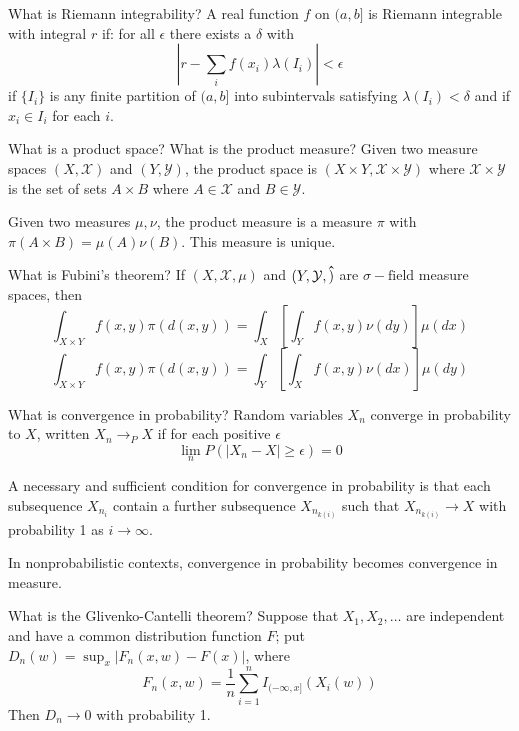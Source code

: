 \documentclass[avery5388,grid,frame]{flashcards}
\newcommand{\sigf}{\sigma-\text{field}}
\begin{document}
\begin{flashcard}
    {What is Riemann integrability?}
    A real function $f$ on $(a,b]$ is Riemann integrable with integral $r$ if: for all $\epsilon$ there exists a $\delta$ with
    $$| r - \sum_i f(x_i) \lambda(I_i) | < \epsilon$$
    if $\{ I_i \}$ is any finite partition of $(a,b]$ into subintervals satisfying $\lambda(I_i) < \delta$ and if $x_i \in I_i$ for each $i$.
\end{flashcard}


\begin{flashcard}
    {What is a product space? What is the product measure?}
    Given two measure spaces $(X,\mathcal X)$ and $(Y,\mathcal Y)$, the product space is $(X \times Y, \mathcal X \times \mathcal Y)$ where $\mathcal X \times \mathcal Y$ is the set of sets $A \times B$ where $A \in \mathcal X$ and $B \in \mathcal Y$.

    Given two measures $\mu, \nu$, the product measure is a measure $\pi$ with $\pi(A \times B) = \mu(A) \nu(B)$. This measure is unique.
\end{flashcard}


\begin{flashcard}
    {What is Fubini's theorem?}
    If $(X, \mathcal X, \mu)$ and $(Y, \mathcal Y, \vu)$ are $\sigf$ measure spaces, then
    $$\int_{X \times Y} f(x,y) \pi(d(x,y)) = \int_X \left [ \int_Y f(x,y) \nu(dy) \right ] \mu(dx)$$
    $$\int_{X \times Y} f(x,y) \pi(d(x,y)) = \int_Y \left [ \int_X f(x,y) \nu(dx) \right ] \mu(dy)$$
\end{flashcard}


\begin{flashcard}
    {What is convergence in probability?}
    Random variables $X_n$ converge in probability to $X$, written $X_n \rightarrow_P X$ if for each positive $\epsilon$
    $$\lim_n P(|X_n - X| \geq \epsilon) = 0$$

    A necessary and sufficient condition for convergence in probability is that each subsequence $X_{n_i}$ contain a further subsequence $X_{n_{k(i)}}$ such that $X_{n_{k(i)}} \rightarrow X$ with probability 1 as $i \rightarrow \infty$.

    In nonprobabilistic contexts, convergence in probability becomes convergence in measure.
\end{flashcard}


\begin{flashcard}
    {What is the Glivenko-Cantelli theorem?}
    Suppose that $X_1, X_2, \dots$ are independent and have a common distribution function $F$; put $D_n(w) = \sup_x |F_n(x, w) - F(x)|$, where
    $$F_n(x,w) = \frac 1 n \sum_{i=1}^n I_{(-\infty,x]}(X_i(w))$$
    Then $D_n \rightarrow 0$ with probability 1.
\end{flashcard}
\end{document}

